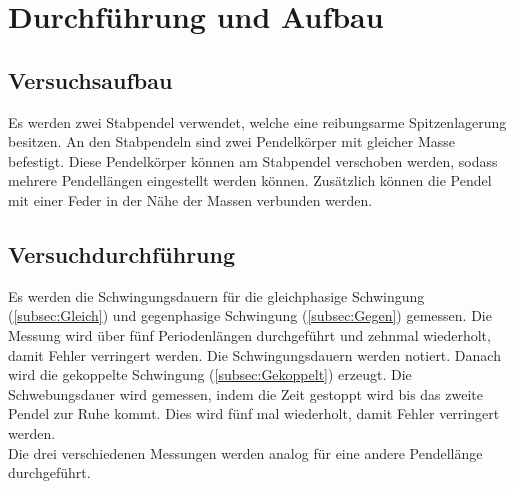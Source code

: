 \section{Durchführung und Aufbau}
\label{sec:Durchführung}
\subsection{Versuchsaufbau} %
\label{sub:Versuchsaufbau}
Es werden zwei Stabpendel verwendet, welche eine reibungsarme Spitzenlagerung besitzen.
An den Stabpendeln sind zwei Pendelkörper mit gleicher Masse befestigt.
Diese Pendelkörper können am Stabpendel verschoben werden, sodass mehrere Pendellängen eingestellt werden können.
Zusätzlich können die Pendel mit einer Feder in der Nähe der Massen verbunden werden.

\subsection{Versuchdurchführung} %
\label{sub:Versuchdurchführung}
Es werden die Schwingungsdauern für die gleichphasige Schwingung (\autoref{subsec:Gleich}) und gegenphasige Schwingung (\autoref{subsec:Gegen}) gemessen.
Die Messung wird über fünf Periodenlängen durchgeführt und zehnmal wiederholt, damit Fehler verringert werden.
Die Schwingungsdauern werden notiert.
Danach wird die gekoppelte Schwingung (\autoref{subsec:Gekoppelt}) erzeugt.
Die Schwebungsdauer wird gemessen, indem die Zeit gestoppt wird bis das zweite Pendel zur Ruhe kommt. 
Dies wird fünf mal wiederholt, damit Fehler verringert werden. \\
Die drei verschiedenen Messungen werden analog für eine andere Pendellänge durchgeführt.


